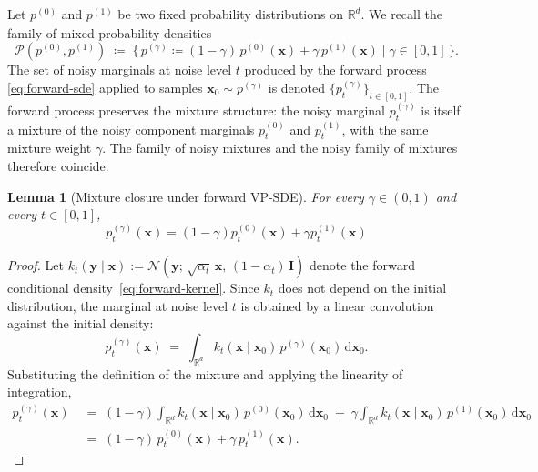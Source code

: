 \documentclass[11pt]{article}
\newcommand{\vect}[1]{\mathbf{#1}}
\newcommand{\RR}{\mathbb{R}}
\newcommand{\CalN}{\mathcal{N}}
\theoremstyle{plain}
\newtheorem{lemma}[theorem]{Lemma}
\newcommand{\1}{\mathbbm{1}}
\newcommand{\vx}{\vect{x}}
\newcommand{\pdist}[2][]{p_{#1}^{(#2)}}
\begin{document}
\begin{appendices}
Let $\pdist{0}$ and $\pdist{1}$ be two fixed probability distributions on $\mathbb{R}^d$. We recall the family of mixed probability densities
\begin{equation*}
    \mathcal{P}(\pdist{0},\pdist{1}) \;\coloneqq\; \big\{\, \pdist{\gamma} \coloneqq (1-\gamma)\,\pdist{0}({\vx}) + \gamma\,\pdist{1}({\vx}) \;\big|\; \gamma \in [0,1] \,\big\}.
\end{equation*}
The set of noisy marginals  at noise level $t$ produced by the forward process \eqref{eq:forward-sde} applied to samples ${\vx}_0 \sim \pdist{\gamma}$ is denoted $\{\pdist[t]{\gamma}\}_{t\in [0,1]}$. 
The forward process preserves the mixture structure: the noisy marginal $\pdist[t]{\gamma}$ is itself a mixture of the noisy component marginals $\pdist[t]{0}$ and $\pdist[t]{1}$, with the same mixture weight $\gamma$. The family of noisy mixtures and the noisy family of mixtures therefore coincide.
\begin{lemma}[Mixture closure under forward VP-SDE]
\label{lemma:mixture-closure}
For every $\gamma \in (0,1)$ and every $t \in [0,1]$, 
\begin{equation}
    \pdist[t]{\gamma} ({\vx}) = (1-\gamma) \pdist[t]{0}({\vx}) + \gamma \pdist[t]{1}({\vx}) 
    \label{eq:mixture-closure}
\end{equation}
\end{lemma}
\begin{proof}
Let $k_t(\vect{y} \mid {\vx}) := \CalN(\vect{y};\, \sqrt{\alpha_t}\,{\vx},\, (1-\alpha_t)\,\vect{I})$ denote the forward conditional density~\eqref{eq:forward-kernel}. Since $k_t$ does not depend on the initial distribution, the marginal at noise level $t$ is obtained by a linear convolution against the initial density:
\[
    \pdist[t]{\gamma}({\vx}) \;=\; \int_{\RR^d} k_t({\vx} \mid {\vx}_0)\,\pdist{\gamma}({\vx}_0)\,\mathrm{d}{\vx}_0.
\]
Substituting the definition of the mixture and applying the linearity of integration,
\begin{align*}
    \pdist[t]{\gamma}({\vx})
    \;&=\; (1-\gamma) \int_{\RR^d} k_t({\vx} \mid {\vx}_0)\,\pdist{0}({\vx}_0)\,\mathrm{d}{\vx}_0
    \;+\; \gamma \int_{\RR^d} k_t({\vx} \mid {\vx}_0)\,\pdist{1}({\vx}_0)\,\mathrm{d}{\vx}_0
    \\
    \;&=\; (1-\gamma)\,\pdist[t]{0}({\vx}) + \gamma\,\pdist[t]{1}({\vx}).
\end{align*}
\end{proof}


\end{appendices}
\end{document}
